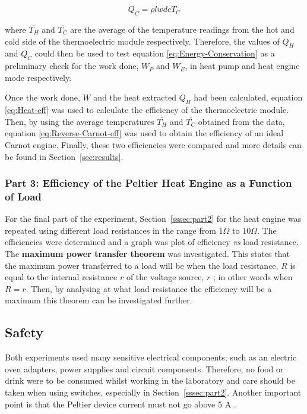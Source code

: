 \documentclass{article}
\newcommand{\secref}[2][Section~]{#1\ref{#2}}
\begin{document}
\begin{equation}
\label{eq:heat-enter}
Q_C = \rho lwdc\overline{T_C}
\end{equation}

\vspace{2mm}  
\noindent
where $\overline{T_H} $ and $\overline{T_C}$ are the average of the temperature readings from the hot and cold side of the thermoelectric module respectively. Therefore, the values of $Q_H$ and $Q_C$ could then be used to test equation \eqref{eq:Energy-Conservation} as a preliminary check for the work done, $W_P$ and $W_E$, in heat pump and heat engine mode respectively.

\vspace{2mm}  
\noindent
Once the work done, $W$ and the heat extracted $Q_H$ had been calculated, equation \eqref{eq:Heat-eff} was used to calculate the efficiency of the thermoelectric module. Then, by using the average temperatures $\overline{T_H} $ and $\overline{T_C}$ obtained from the data, equation \eqref{eq:Reverse-Carnot-eff} was used to obtain the efficiency of an ideal Carnot engine. Finally, these two efficiencies were compared and more details can be found in \secref{sec:results}.

\subsubsection{Part 3: Efficiency of the Peltier Heat Engine as a Function of Load}
\label{sssec:part3}

For the final part of the experiment, \secref{sssec:part2} for the heat engine was repeated using different load resistances in the range from $1 \Omega$ to $10 \Omega$. The efficiencies were determined and a graph was plot of efficiency \textit{vs} load resistance. The \textbf{maximum power transfer theorem} was investigated. This states that the maximum power transferred to a load will be when the load resistance, $R$ is equal to the internal resistance $r$ of the voltage source, $r$ \cite{Paper02}; in other words when $R = r$. Then, by analysing at what load resistance the efficiency will be a maximum this theorem can be investigated further.

\subsection{Safety}
\label{ssec:safety}
Both experiments used many sensitive electrical components; such as an electric oven adapters, power supplies and circuit components. Therefore, no food or drink were to be consumed whilst working in the laboratory and care should be taken when using switches, especially in \secref{sssec:part2}. Another important point is that the Peltier device current must not go above 5 A \cite{Paper02}. 
\end{document}
